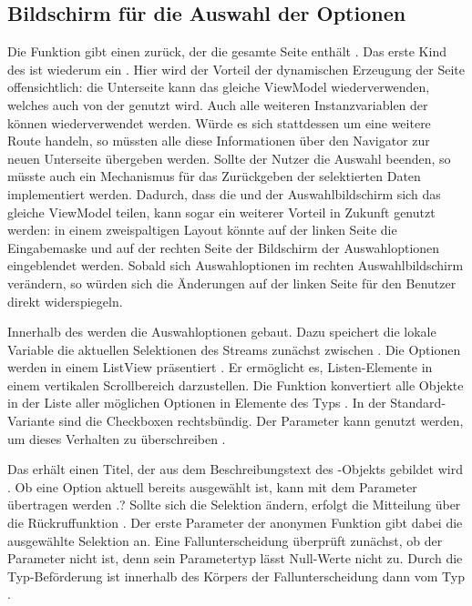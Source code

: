 \subsection{Bildschirm für die Auswahl der Optionen}

 
Die Funktion  \Lst{\ref{lst:Schritt1FunktionCreateMultipleChoiceSelectionScreen}} gibt einen  zurück, der die gesamte Seite enthält .
Das erste Kind des  ist wiederum ein  .
Hier wird der Vorteil der dynamischen Erzeugung der Seite offensichtlich: die Unterseite kann das gleiche ViewModel wiederverwenden, welches auch von der  genutzt wird.  Auch alle weiteren Instanzvariablen der  können wiederverwendet werden. Würde es sich stattdessen um eine weitere Route handeln, so müssten alle diese Informationen über den Navigator zur neuen Unterseite übergeben werden. Sollte der Nutzer die Auswahl beenden, so müsste auch ein Mechanismus für das Zurückgeben der selektierten Daten implementiert werden.
Dadurch, dass die  und der Auswahlbildschirm sich das gleiche ViewModel teilen, kann sogar ein weiterer Vorteil in Zukunft genutzt werden: in einem zweispaltigen Layout könnte auf der linken Seite die Eingabemaske und auf der rechten Seite der Bildschirm der Auswahloptionen eingeblendet werden.
Sobald sich Auswahloptionen im rechten Auswahlbildschirm verändern, so würden sich die Änderungen auf der linken Seite für den Benutzer direkt widerspiegeln.

Innerhalb des  werden die Auswahloptionen gebaut.
Dazu speichert die lokale Variable  die aktuellen Selektionen des Streams zunächst zwischen .
Die Optionen werden in einem ListView präsentiert .
Er ermöglicht es, Listen-Elemente in einem vertikalen Scrollbereich darzustellen.
Die Funktion  konvertiert alle Objekte in der Liste aller möglichen Optionen  in Elemente des Typs  .
In der Standard-Variante sind die Checkboxen rechtsbündig.
Der Parameter  kann genutzt werden, um dieses Verhalten zu überschreiben .

Das  erhält einen Titel, der aus dem Beschreibungstext  des -Objekts gebildet wird .
Ob eine Option aktuell bereits ausgewählt ist, kann mit dem Parameter  übertragen werden .?
Sollte sich die Selektion ändern, erfolgt die Mitteilung über die Rückruffunktion  .
Der erste Parameter der anonymen Funktion gibt dabei die ausgewählte Selektion an.
Eine Fallunterscheidung überprüft zunächst, ob der Parameter  nicht  ist, denn sein Parametertyp  lässt Null-Werte nicht zu.
Durch die Typ-Beförderung ist  innerhalb des Körpers der Fallunterscheidung dann vom Typ  . 


